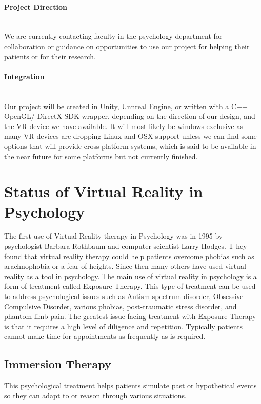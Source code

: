 \documentclass[a4paper,10pt]{article}
\begin{document}
	
	\paragraph{Project Direction} ~\\ We are currently contacting faculty in the psychology department for collaboration or guidance on opportunities to use our project for helping their patients or for their research.
	\paragraph{Integration} ~\\ Our project will be created in Unity, Unnreal Engine, or written with a C++ OpenGL/ DirectX SDK wrapper, depending on the direction of our design, and the VR device we have available. It will most likely be windows exclusive as many VR devices are dropping Linux and OSX support unless we can find some options that will provide cross platform systems, which is said to be available in the near future for some platforms but not currently finished.  
	
	\pagebreak
	
	\section{Status of Virtual Reality in Psychology}
	The first use of Virtual Reality therapy in Psychology was in 1995 by psychologist Barbara Rothbaum and computer scientist Larry Hodges. T
	hey found that virtual reality therapy could help patients overcome phobias such as arachnophobia or a fear of heights. Since then many others 
	have used virtual reality as a tool in psychology. The main use of virtual reality in psychology is a form of treatment called Exposure Therapy. 
	This type of treatment can be used to address psychological issues such as Autism spectrum disorder, Obsessive Compulsive Disorder, various phobias, 
	post-traumatic stress disorder, and phantom limb pain. The greatest issue facing treatment with Exposure Therapy is that it requires a high level of diligence and
	repetition. Typically patients cannot make time for appointments as frequently as is required.
	
	\subsection{Immersion Therapy}
	This psychological treatment helps patients simulate past or hypothetical events so they can adapt to or reason through
	various situations. 
\end{document}
